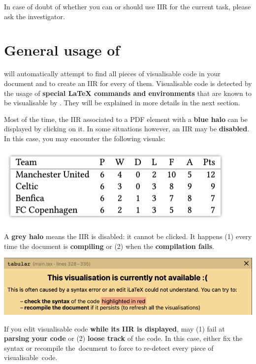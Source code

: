 \documentclass[11pt, a4paper]{article}
\begin{document}
In case of doubt of whether you can or should use IIR for the current task, please ask the investigator.



\section{General usage of \iLaTeX{}}
\iLaTeX{} will automatically attempt to find all pieces of visualisable code in your document and to create an IIR for every of them.
Visualisable code is detected by the usage of \textbf{special \LaTeX{} commands and environments} that are known to be visualisable by \iLaTeX{}. They will be explained in more details in the next section.

Most of the time, the IIR associated to a PDF element with a \textbf{blue halo} can be displayed by clicking on it.
In some situations however, an IIR may be \textbf{disabled}. In this case, you may encounter the following visuals:

\newpage
\begin{minipage}[t][2.5cm][c]{0.45\textwidth}
    \includegraphics[width=\textwidth]{img/disabled-table.png}
\end{minipage}
\hspace{0.05\textwidth}
\begin{minipage}[t][2.5cm][c]{0.5\textwidth}
    A \textbf{grey halo} means the IIR is disabled: it cannot be clicked.
    It happens (1) every time the document is \textbf{compiling} or (2) when the \textbf{compilation fails}.
\end{minipage}
\begin{minipage}[t][2.5cm][c]{0.45\textwidth}
    \includegraphics[width=\textwidth]{img/syntax-error-in-visualisation.png}
\end{minipage}
\hspace{0.05\textwidth}
\begin{minipage}[t][2.5cm][c]{0.5\textwidth}
    If you edit visualisable code \textbf{while its IIR is displayed}, \iLaTeX{} may (1) fail at \textbf{parsing your code} or (2) \textbf{loose track} of the code.
    In this case, either fix the syntax or recompile \mbox{the document} to force \iLaTeX{} to re-detect every piece of \mbox{visualisable code}.
\end{minipage}
\end{document}
